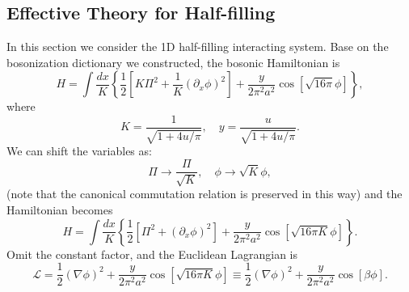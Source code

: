 \subsection{Effective Theory for Half-filling}
In this section we consider the 1D half-filling interacting system.
Base on the bosonization dictionary we constructed, the bosonic Hamiltonian is
\begin{equation}
	H = \int \frac{dx}{K} \left\{ \frac{1}{2}\left[K \Pi^2 + \frac{1}{K}(\partial_x\phi)^2 \right] + \frac{y}{2\pi^2 a^2} \cos\left[\sqrt{16\pi}\phi\right] \right\},
\end{equation}
where
\begin{equation}
	K = \frac{1}{\sqrt{1+4u/\pi}}, \quad
	y = \frac{u}{\sqrt{1+4u/\pi}}.
\end{equation}
We can shift the variables as:
\begin{equation}
	\Pi \rightarrow \frac{\Pi}{\sqrt K}, \quad
	\phi \rightarrow \sqrt K \phi,
\end{equation}
(note that the canonical commutation relation is preserved in this way) and the Hamiltonian becomes
\begin{equation}
	H = \int \frac{dx}{K} \left\{ \frac{1}{2}\left[\Pi^2 + (\partial_x\phi)^2 \right] + \frac{y}{2\pi^2 a^2} \cos\left[\sqrt{16\pi K}\phi\right] \right\}.
\end{equation}
Omit the constant factor, and the Euclidean Lagrangian is
\begin{equation}
	\mathcal L = \frac{1}{2}(\nabla \phi)^2 + \frac{y}{2\pi^2 a^2} \cos\left[\sqrt{16\pi K}\phi\right]
	\equiv \frac{1}{2}(\nabla \phi)^2 + \frac{y}{2\pi^2 a^2} \cos\left[\beta\phi\right].
\end{equation}


